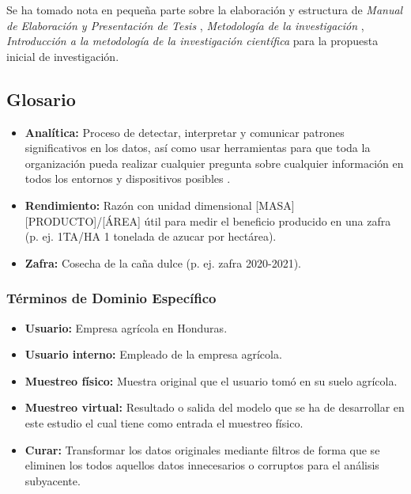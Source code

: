 %
%

Se ha tomado nota en pequeña parte sobre la elaboración y estructura de \textit{Manual de Elaboración y Presentación de Tesis} \cite{universidad-san-carlos-2016}, \textit{Metodología de la investigación} \cite{collado-2014}, \textit{Introducción a la metodología de la investigación científica} \cite{cabezas-2018} para la propuesta inicial de investigación.

\subsection{Glosario}

\begin{itemize}
    \item \textbf{Analítica:} Proceso de detectar, interpretar y comunicar patrones significativos en los datos, así como usar herramientas para que toda la organización pueda realizar cualquier pregunta sobre cualquier información en todos los entornos y dispositivos posibles \cite{oracle-2021}.

    \item \textbf{Rendimiento:} Razón con unidad dimensional [MASA][PRODUCTO]/[ÁREA] útil para medir el beneficio producido en una zafra (p. ej. 1TA/HA 1 tonelada de azucar por hectárea).

    \item \textbf{Zafra:} Cosecha de la caña dulce (p. ej. zafra 2020-2021).
\end{itemize}

\subsubsection{Términos de Dominio Específico}

\begin{itemize}
    \item \textbf{Usuario:} Empresa agrícola en Honduras.

    \item \textbf{Usuario interno:} Empleado de la empresa agrícola.

    \item \textbf{Muestreo físico:} Muestra original que el usuario tomó en su suelo agrícola.

    \item \textbf{Muestreo virtual:} Resultado o salida del modelo que se ha de desarrollar en este estudio el cual tiene como entrada el muestreo físico.

    \item \textbf{Curar:} Transformar los datos originales mediante filtros de forma que se eliminen los todos aquellos datos innecesarios o corruptos para el análisis subyacente.
\end{itemize}


